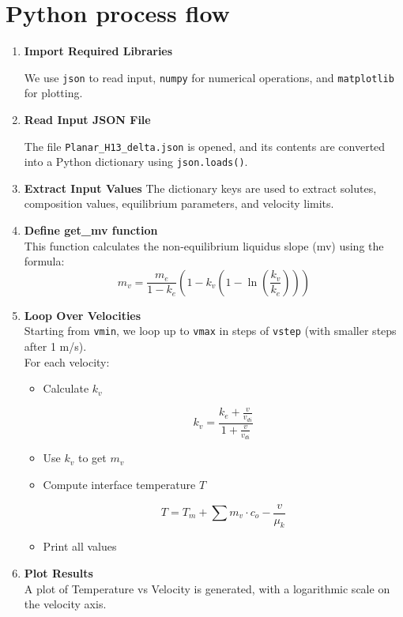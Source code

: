 \documentclass{article}
\begin{document}
\section{Python process flow}
\begin{enumerate}
    \item \textbf{Import Required Libraries}

     We use \verb|json| to read input, \verb|numpy| for numerical operations, and \verb|matplotlib| for plotting. 

     \item \textbf{Read Input JSON File}

     The file \verb|Planar_H13_delta.json| is opened, and its contents are converted into a Python dictionary using \verb|json.loads()|. 

     \item \textbf{Extract Input Values}
     The dictionary keys are used to extract solutes, composition values, equilibrium parameters, and velocity limits.

     \item \textbf{Define get\_mv function}
     \\This function calculates the non-equilibrium liquidus slope (mv) using the formula:
        $$
        m_v = \frac{m_e}{1 - k_e} \left( 1 - k_v \left( 1 - \ln\left(\frac{k_v}{k_e}\right) \right) \right)
        $$
    \item \textbf{Loop Over Velocities}
    \\Starting from \texttt{vmin}, we loop up to \texttt{vmax} in steps of \texttt{vstep} (with smaller steps after 1 m/s). \\For each velocity:
        \begin{itemize}
            \item Calculate \texttt{$k_v$}
                
                $$k_v=\frac{k_e+\frac{v}{v_{di}}}{1+\frac{v}{v_{di}}}$$
            
            \item Use \texttt{$k_v$} to get \texttt{$m_v$}
            \item Compute interface temperature \texttt{$T$}

                $$T=T_m+ \sum m_v \cdot c_{o}-\frac{v}{\mu_k}$$
            
            \item Print all values
        \end{itemize}
    \item \textbf{Plot Results}
    \\A plot of Temperature vs Velocity is generated, with a logarithmic scale on the velocity axis.


\end{enumerate}
\end{document}

